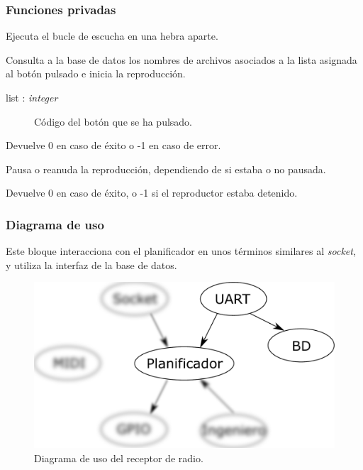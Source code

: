 \subsubsection{Funciones privadas}

\begin{description}[style=nextline]
	\item[uart\_run ()]
	Ejecuta el bucle de escucha en una hebra aparte.
	
	\item[uart\_playlist (list) : \textit{integer}]
	Consulta a la base de datos los nombres de archivos asociados a la lista asignada al botón pulsado e inicia la reproducción.
	
	\begin{description}
		\item[list : \textit{integer}] Código del botón que se ha pulsado.
	\end{description}
	
	Devuelve 0 en caso de éxito o -1 en caso de error.
	
	\item[uart\_pause () : \textit{integer}]
	Pausa o reanuda la reproducción, dependiendo de si estaba o no pausada.
	
	Devuelve 0 en caso de éxito, o -1 si el reproductor estaba detenido.
\end{description}

\subsubsection{Diagrama de uso}

Este bloque interacciona con el planificador en unos términos similares al \textit{socket}, y utiliza la interfaz de la base de datos.

\smallskip

\begin{figure}[H]
	\noindent \begin{centering}
		\includegraphics[width=\linewidth/2]{capitulo4/daemon_uart}
		\par\end{centering}
	\smallskip
	\caption{\label{fig:daemon_uart} Diagrama de uso del receptor de radio.}
\end{figure} 

